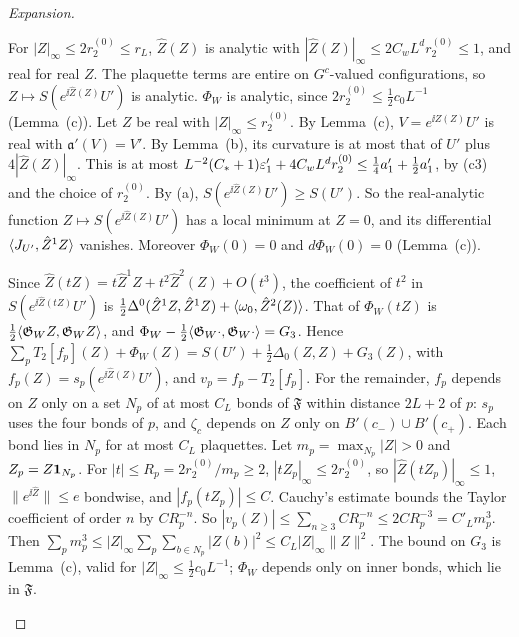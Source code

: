 \begin{proof}[Expansion]
\begin{step}
For $|Z|_\infty\le2r^{(0)}_2\le r_L$, $\hat Z(Z)$ is analytic with $|\hat Z(Z)|_\infty\le2C_wL^dr^{(0)}_2\le1$, and real for real $Z$. The plaquette terms are entire on $G^c$-valued configurations, so $Z\mapsto S(e^{\ii\hat Z(Z)}U')$ is analytic. $\Phi_W$ is analytic, since $2r^{(0)}_2\le\frac12c_0L^{-1}$ (Lemma~(c)). Let $Z$ be real with $|Z|_\infty\le r^{(0)}_2$. By Lemma~(c), $V=e^{\ii\hat Z(Z)}U'$ is real with $\mathfrak a'(V)=V'$. By Lemma~(b), its curvature is at most that of $U'$ plus $4|\hat Z(Z)|_\infty$. This is at most $L^{-2}(C_*+1)\varepsilon'_1+4C_wL^dr^{(0)}_2\le\frac14a'_1+\frac12a'_1$, by (c3) and the choice of $r^{(0)}_2$. By (a), $S(e^{\ii\hat Z(Z)}U')\ge S(U')$. So the real-analytic function $Z\mapsto S(e^{\ii\hat Z(Z)}U')$ has a local minimum at $Z=0$, and its differential $\langle J_{U'},\hat Z^1Z\rangle$ vanishes. Moreover $\Phi_W(0)=0$ and $d\Phi_W(0)=0$ (Lemma~(c)).
\end{step}

\begin{step}
Since $\hat Z(tZ)=t\hat Z^1Z+t^2\hat Z^2(Z)+O(t^3)$, the coefficient of $t^2$ in $S(e^{\ii\hat Z(tZ)}U')$ is $\frac12\Delta^0(\hat Z^1Z,\hat Z^1Z)+\langle \omega_0,\hat Z^2(Z)\rangle$. That of $\Phi_W(tZ)$ is $\frac12\langle \mathfrak G_WZ,\mathfrak G_WZ\rangle$, and $\Phi_W-\frac12\langle \mathfrak G_W\cdot,\mathfrak G_W\cdot\rangle=G_3$. Hence $\sum_pT_2[f_p](Z)+\Phi_W(Z)=S(U')+\frac12\Delta_0(Z,Z)+G_3(Z)$, with $f_p(Z)=s_p(e^{\ii\hat Z(Z)}U')$, and $v_p=f_p-T_2[f_p]$. For the remainder, $f_p$ depends on $Z$ only on a set $N_p$ of at most $C_L$ bonds of $\mathfrak F$ within distance $2L+2$ of $p$: $s_p$ uses the four bonds of $p$, and $\zeta_c$ depends on $Z$ only on $B'(c_-)\cup B'(c_+)$. Each bond lies in $N_p$ for at most $C_L$ plaquettes. Let $m_p=\max_{N_p}|Z|>0$ and $Z_p=Z\mathbf 1_{N_p}$. For $|t|\le R_p=2r^{(0)}_2/m_p\ge2$, $|tZ_p|_\infty\le2r^{(0)}_2$, so $|\hat Z(tZ_p)|_\infty\le1$, $\|e^{\ii\hat Z}\|\le e$ bondwise, and $|f_p(tZ_p)|\le C$. Cauchy's estimate bounds the Taylor coefficient of order $n$ by $CR_p^{-n}$. So $|v_p(Z)|\le\sum_{n\ge3}CR_p^{-n}\le2CR_p^{-3}=C'_Lm_p^3$. Then $\sum_pm_p^3\le|Z|_\infty\sum_p\sum_{b\in N_p}|Z(b)|^2\le C_L|Z|_\infty\|Z\|^2$. The bound on $G_3$ is Lemma~(c), valid for $|Z|_\infty\le\frac12c_0L^{-1}$; $\Phi_W$ depends only on inner bonds, which lie in $\mathfrak F$.
\end{step}


\end{proof}
